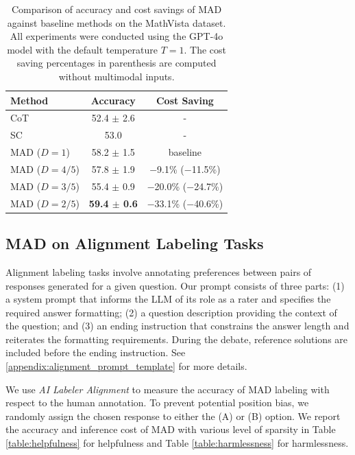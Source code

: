 \documentclass[11pt]{article}
\begin{document}
\begin{table}
  \centering
  \begin{tabular}{l|cc}
    \hline
    \textbf{Method} & Accuracy & Cost Saving \\
    \hline
    CoT & 52.4 $\pm$ 2.6 &  - \\
    SC  & 53.0 &  - \\
    \hline
    MAD ($D=1$) & 58.2 $\pm$ 1.5 & baseline \\
    MAD ($D=4/5$) & 57.8 $\pm$ 1.9 & $-$9.1\% ($-$11.5\%) \\
    MAD ($D=3/5$) & 55.4 $\pm$ 0.9 & $-$20.0\% ($-$24.7\%) \\
    MAD ($D=2/5$) & \textbf{59.4 $\pm$ 0.6} & $-$33.1\% ($-$40.6\%) \\
    \hline
  \end{tabular}
 \caption{Comparison of accuracy and cost savings of MAD against baseline methods on the MathVista dataset. All experiments were conducted using the GPT-4o model with the default temperature $T=1$. The cost saving percentages in parenthesis are computed without multimodal inputs.}
\label{table:mathvista}
\end{table}


\subsection{MAD on Alignment Labeling Tasks}
Alignment labeling tasks involve annotating preferences between pairs of responses generated for a given question. Our prompt consists of three parts: (1) a system prompt that informs the LLM of its role as a rater and specifies the required answer formatting; (2) a question description providing the context of the question; and (3) an ending instruction that constrains the answer length and reiterates the formatting requirements. During the debate, reference solutions are included before the ending instruction. See \ref{appendix:alignment_prompt_template} for more details.

We use \textit{AI Labeler Alignment} \cite{lee2023rlaif} to measure the accuracy of MAD labeling with respect to the human annotation. To prevent potential position bias, we randomly assign the chosen response to either the (A) or (B) option. We report the accuracy and inference cost of MAD with various level of sparsity in Table \ref{table:helpfulness} for helpfulness and Table \ref{table:harmlessness} for harmlessness.
\end{document}
